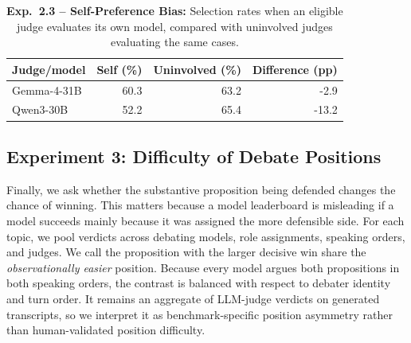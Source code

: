 \documentclass{article}
\begin{document}
\begin{table}[!t]
  \centering
  \caption{\textbf{Exp.~2.3 -- Self-Preference Bias:} Selection rates when an eligible judge evaluates its own model, compared with uninvolved judges evaluating the same cases.}
  \label{tab:current-self-preference}
  \begin{tabular}{lrrr}
    \toprule
    Judge/model & Self (\%) & Uninvolved (\%) & Difference (pp) \\
    \midrule
    Gemma-4-31B & 60.3 & 63.2 & -2.9 \\
    Qwen3-30B & 52.2 & 65.4 & -13.2 \\
    \bottomrule
  \end{tabular}
\end{table}

\subsection{Experiment 3: Difficulty of Debate Positions}

Finally, we ask whether the substantive proposition being defended changes the chance of winning. This matters because a model leaderboard is misleading if a model succeeds mainly because it was assigned the more defensible side. For each topic, we pool verdicts across debating models, role assignments, speaking orders, and judges. We call the proposition with the larger decisive win share the \emph{observationally easier} position. Because every model argues both propositions in both speaking orders, the contrast is balanced with respect to debater identity and turn order. It remains an aggregate of LLM-judge verdicts on generated transcripts, so we interpret it as benchmark-specific position asymmetry rather than human-validated position difficulty.
\end{document}
